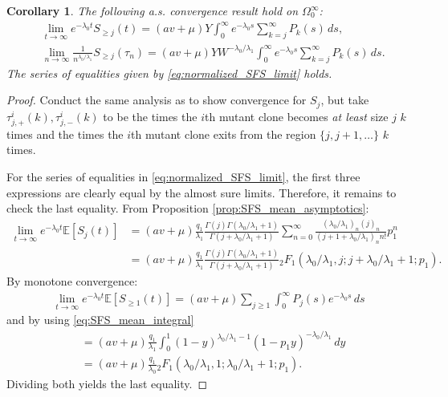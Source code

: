 \documentclass{article}
\numberwithin{equation}{section}
\newtheorem{corollary}[theorem]{Corollary}
\begin{document}
\begin{corollary}
  The following a.s. convergence result hold on $\Omega_0^\infty$:
  \begin{align*}
    &\lim_{t\to\infty}e^{-\lambda_0 t}S_{\geq j}(t)=(av+\mu)Y\int_0^\infty e^{-\lambda_0 s}\sum_{k=j}^\infty P_k(s)\,ds,\\
    &\lim_{n\to\infty}\frac{1}{n^{\lambda_0/\lambda_1}}S_{\geq j}(\tau_n)=(av+\mu)YW^{-\lambda_0/\lambda_1}\int_0^\infty e^{-\lambda_0 s}\sum_{k=j}^\infty P_k(s)\,ds.
  \end{align*}
  The series of equalities given by \ref{eq:normalized_SFS_limit} holds.
\end{corollary}

\begin{proof}
  Conduct the same analysis as to show convergence for $S_j$, but take $\tau_{j,+}^i(k),\tau_{j,-}^i(k)$ to be the times the $i$th mutant clone becomes \textit{at least} size $j$ $k$ times and the times the $i$th mutant clone exits from the region $\{j,j+1,\dots\}$ $k$ times.

  For the series of equalities in \ref{eq:normalized_SFS_limit}, the first three expressions are clearly equal by the almost sure limits. Therefore, it remains to check the last equality. From Proposition \ref{prop:SFS_mean_asymptotics}:
  \begin{align*}
      \lim_{t\to\infty}e^{-\lambda_0 t}\mathbb{E}[S_j(t)]&=(av+\mu)\frac{q_1}{\lambda_1}\frac{\Gamma(j)\Gamma(\lambda_0/\lambda_1+1)}{\Gamma(j+\lambda_0/\lambda_1+1)}\sum_{n=0}^\infty \frac{(\lambda_0/\lambda_1)_n(j)_n}{(j+1+\lambda_0/\lambda_1)_n n!}p_1^n\\
      &=(av+\mu)\frac{q_1}{\lambda_1}\frac{\Gamma(j)\Gamma(\lambda_0/\lambda_1+1)}{\Gamma(j+\lambda_0/\lambda_1+1)}{}_2F_1(\lambda_0/\lambda_1,j;j+\lambda_0/\lambda_1+1;p_1).
  \end{align*}
  By monotone convergence:
  \begin{align*}
      \lim_{t\to\infty}e^{-\lambda_0 t}\mathbb{E}[S_{\geq 1}(t)]=(av+\mu)\sum_{j\geq 1}\int_0^\infty P_j(s)e^{-\lambda_0 s}\,ds
  \end{align*}
  and by using \ref{eq:SFS_mean_integral}
  \begin{align*}
      &=(av+\mu)\frac{q_1}{\lambda_1}\int_0^1 (1-y)^{\lambda_0/\lambda_1-1}(1-p_1 y)^{-\lambda_0/\lambda_1}\,dy\\
      &=(av+\mu)\frac{q_1}{\lambda_0}{}_2F_1(\lambda_0/\lambda_1,1;\lambda_0/\lambda_1+1;p_1).
  \end{align*}
  Dividing both yields the last equality.
\end{proof}
\end{document}
